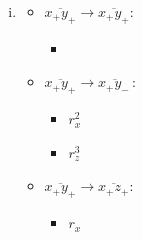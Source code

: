 \begin{enumerate}[(a)]
\begin{enumerate}[(i)]
\begin{multicols}{4}
\begin{itemize}
		\item
		$\overline{x_+z_+}$
		
		\item
		$\overline{x_+z_-\,}$
		
		\item
		$\overline{x_-\,y_+}$
		
		\item
		$\overline{x_-\,y_-\,}$
		
		\item
		$\overline{x_-\,z_+}$
		
		\item
		$\overline{x_-\,z_-\,}$
		
		\item
		$\overline{y_+z_+}$
		
		\item
		$\overline{y_+z_-\,}$
		
		\item
		$\overline{y_-\,z_+}$
		
		\item
		$\overline{y_-\,z_-\,}$
		\end{itemize}
		\end{multicols}
	
	
\item 
	\begin{multicols}{3}
		\begin{itemize}
		\item
		$\overline{x_+y_+} \rightarrow \overline{x_+y_+}$: 
			\begin{itemize}
			\item
			\end{itemize}
	 
	 	\item
	 	$\overline{x_+y_+} \rightarrow \overline{x_+y_-\,}$: 
	 		\begin{itemize}
	 		\item
	 		$r_x^2$
	 		
	 		\item
	 		$r_z^3$
	 		\end{itemize}
	 	
	 	\item
	 	$\overline{x_+y_+} \rightarrow \overline{x_+z_+}$: 
	 		\begin{itemize}
	 		\item
	 		$r_x$
	 		\end{itemize}
	 		

\end{itemize}
\end{multicols}
\end{enumerate}
\end{enumerate}
